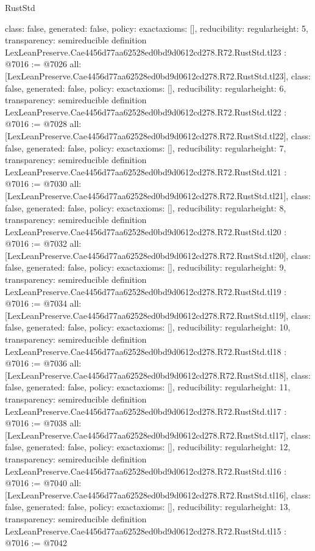 \begin{lexlean}{RustStd}
\begin{coremodule}
{  class: false,
  generated: false,
  policy: exact{axioms: []},
  reducibility: regular{height: 5},
  transparency: semireducible
}
definition LexLeanPreserve.Cae4456d77aa62528ed0bd9d0612cd278.R72.RustStd.tl23 : @7016 := @7026 {
  all: [LexLeanPreserve.Cae4456d77aa62528ed0bd9d0612cd278.R72.RustStd.tl23],
  class: false,
  generated: false,
  policy: exact{axioms: []},
  reducibility: regular{height: 6},
  transparency: semireducible
}
definition LexLeanPreserve.Cae4456d77aa62528ed0bd9d0612cd278.R72.RustStd.tl22 : @7016 := @7028 {
  all: [LexLeanPreserve.Cae4456d77aa62528ed0bd9d0612cd278.R72.RustStd.tl22],
  class: false,
  generated: false,
  policy: exact{axioms: []},
  reducibility: regular{height: 7},
  transparency: semireducible
}
definition LexLeanPreserve.Cae4456d77aa62528ed0bd9d0612cd278.R72.RustStd.tl21 : @7016 := @7030 {
  all: [LexLeanPreserve.Cae4456d77aa62528ed0bd9d0612cd278.R72.RustStd.tl21],
  class: false,
  generated: false,
  policy: exact{axioms: []},
  reducibility: regular{height: 8},
  transparency: semireducible
}
definition LexLeanPreserve.Cae4456d77aa62528ed0bd9d0612cd278.R72.RustStd.tl20 : @7016 := @7032 {
  all: [LexLeanPreserve.Cae4456d77aa62528ed0bd9d0612cd278.R72.RustStd.tl20],
  class: false,
  generated: false,
  policy: exact{axioms: []},
  reducibility: regular{height: 9},
  transparency: semireducible
}
definition LexLeanPreserve.Cae4456d77aa62528ed0bd9d0612cd278.R72.RustStd.tl19 : @7016 := @7034 {
  all: [LexLeanPreserve.Cae4456d77aa62528ed0bd9d0612cd278.R72.RustStd.tl19],
  class: false,
  generated: false,
  policy: exact{axioms: []},
  reducibility: regular{height: 10},
  transparency: semireducible
}
definition LexLeanPreserve.Cae4456d77aa62528ed0bd9d0612cd278.R72.RustStd.tl18 : @7016 := @7036 {
  all: [LexLeanPreserve.Cae4456d77aa62528ed0bd9d0612cd278.R72.RustStd.tl18],
  class: false,
  generated: false,
  policy: exact{axioms: []},
  reducibility: regular{height: 11},
  transparency: semireducible
}
definition LexLeanPreserve.Cae4456d77aa62528ed0bd9d0612cd278.R72.RustStd.tl17 : @7016 := @7038 {
  all: [LexLeanPreserve.Cae4456d77aa62528ed0bd9d0612cd278.R72.RustStd.tl17],
  class: false,
  generated: false,
  policy: exact{axioms: []},
  reducibility: regular{height: 12},
  transparency: semireducible
}
definition LexLeanPreserve.Cae4456d77aa62528ed0bd9d0612cd278.R72.RustStd.tl16 : @7016 := @7040 {
  all: [LexLeanPreserve.Cae4456d77aa62528ed0bd9d0612cd278.R72.RustStd.tl16],
  class: false,
  generated: false,
  policy: exact{axioms: []},
  reducibility: regular{height: 13},
  transparency: semireducible
}
definition LexLeanPreserve.Cae4456d77aa62528ed0bd9d0612cd278.R72.RustStd.tl15 : @7016 := @7042 {
}
\end{coremodule}
\end{lexlean}
